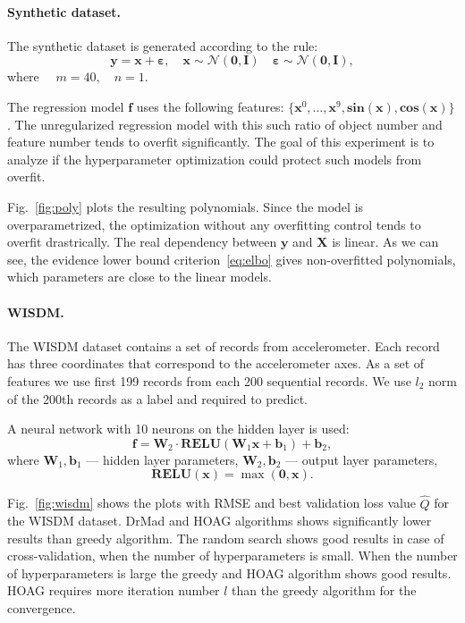 \documentclass[smallcondensed]{svjour3}
\begin{document}
\paragraph{Synthetic dataset.}
The synthetic dataset is generated according to the rule:
\[
	\mathbf{y} = \mathbf{x} + \boldsymbol{\varepsilon},\quad \mathbf{x}  \sim \mathcal{N}(\mathbf{0}, \mathbf{I}) \quad \boldsymbol{\varepsilon} \sim \mathcal{N}(\mathbf{0}, \mathbf{I}),
\]
where $\quad m = 40, \quad n = 1.$

The regression model $\mathbf{f}$ uses the following features: $\{\mathbf{x}^0, \dots, \mathbf{x}^9, \textbf{sin}(\mathbf{x}), \textbf{cos}(\mathbf{x})\}$. The unregularized regression model with this such ratio of  object number and feature number tends to overfit significantly. The goal of this experiment is to analyze if the hyperparameter optimization could protect such models from overfit.

Fig.~\ref{fig:poly} plots the resulting polynomials.  Since the model is overparametrized, the optimization without any overfitting control tends to overfit drastrically. The real dependency between $\mathbf{y}$ and $\mathbf{X}$ is linear. As we can see, the evidence lower bound criterion~\eqref{eq:elbo} gives non-overfitted polynomials, which parameters are close to the linear models.

\paragraph{WISDM.}
The WISDM dataset contains a set of records from accelerometer. Each record has three coordinates that correspond to the accelerometer axes. As a set of features we use first 199  records from each 200 sequential records. We use $l_2$ norm of the 200th records as a label and required to predict. 

A neural network with 10 neurons on the hidden layer is used:
\[
    \mathbf{f} = \mathbf{W}_2 \cdot \textbf{RELU}(\mathbf{W}_1\mathbf{x} + \mathbf{b}_1) +\mathbf{b}_2,
\]
where $\mathbf{W}_1, \mathbf{b}_1$ --- hidden layer parameters,
$\mathbf{W}_2, \mathbf{b}_2$ --- output layer parameters,
\[
    \textbf{RELU}(\mathbf{x}) = \max(\mathbf{0}, \mathbf{x}).
\]

Fig.~\ref{fig:wisdm} shows the plots with RMSE and best validation loss value $\hat{Q}$ for the WISDM dataset.
DrMad and HOAG algorithms shows significantly lower results than greedy algorithm. The random search shows good results in case of cross-validation, when the number of hyperparameters is small. When the number of hyperparameters is large the greedy and HOAG algorithm shows good results. HOAG requires more iteration number $l$ than the greedy algorithm for the convergence.
\end{document}
